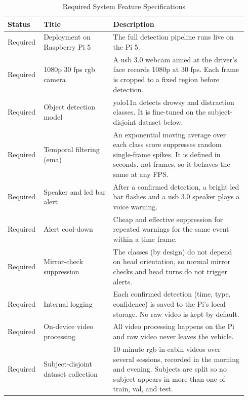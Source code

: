 \begin{table}[htbp]
\centering
\caption{Required System Feature Specifications}
\label{tab:req-features}
\footnotesize
\setlength{\tabcolsep}{4pt}
\renewcommand{\arraystretch}{1.15}
\begin{tabular}{|p{0.12\linewidth}|p{0.28\linewidth}|p{0.54\linewidth}|}
\hline
\textbf{Status} & \textbf{Title} & \textbf{Description} \\
\hline
Required & Deployment on Raspberry Pi 5 & The full detection pipeline runs live on the Pi 5. \\
\hline
Required & 1080p 30 \gls{fps} \gls{rgb} camera & A \gls{usb} 3.0 webcam aimed at the driver's face records 1080p at 30 \gls{fps}. Each frame is cropped to a fixed region before detection. \\
\hline
Required & Object detection model & \gls{yolo}11n detects drowsy and distraction classes. It is fine-tuned on the subject-disjoint dataset below. \\
\hline
Required & Temporal filtering (\gls{ema}) & An exponential moving average over each class score suppresses random single-frame spikes. It is defined in seconds, not frames, so it behaves the same at any FPS. \\
\hline
Required & Speaker and \gls{led} bar alert & After a confirmed detection, a bright \gls{led} bar flashes and a \gls{usb} 3.0 speaker plays a voice warning. \\
\hline
Required & Alert cool-down & Cheap and effective suppression for repeated warnings for the same event within a time frame.\\
\hline
Required & Mirror-check suppression & The classes (by design) do not depend on head orientation, so normal mirror checks and head turns do not trigger alerts. \\
\hline
Required & Internal logging & Each confirmed detection (time, type, confidence) is saved to the Pi's local storage. No raw video is kept by default. \\
\hline
Required & On-device video processing & All video processing happens on the Pi and raw video never leaves the vehicle. \\
\hline
Required & Subject-disjoint dataset collection & 10-minute \gls{rgb} in-cabin videos over several sessions, recorded in the morning and evening. Subjects are split so no subject appears in more than one of train, val, and test.\\
\hline
\end{tabular}
\end{table}

